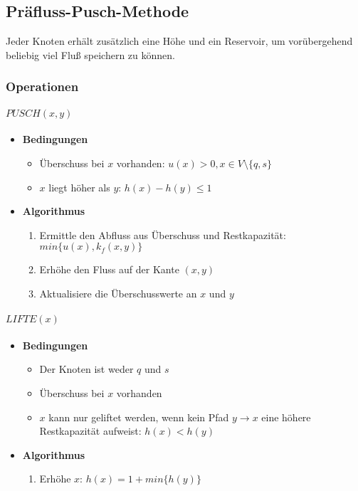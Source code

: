 \subsection{Präfluss-Pusch-Methode}
Jeder Knoten erhält zusätzlich eine Höhe und ein Reservoir, um vorübergehend beliebig viel Fluß speichern zu können.

\subsubsection{Operationen}

\paragraph{\(PUSCH(x,y)\)}
\begin{itemize}
	\item \textbf{Bedingungen}
	\begin{itemize}
		\item Überschuss bei \(x\) vorhanden: \(u(x) > 0, x \in V \setminus \{q,s\}\)
		\item \(x\) liegt höher als \(y\): \(h(x) - h(y) \leq 1\)
	\end{itemize}
	\item \textbf{Algorithmus}
	\begin{enumerate}
		\item Ermittle den Abfluss aus Überschuss und Restkapazität: \(min\{u(x), k_f(x,y)\}\)
		\item Erhöhe den Fluss auf der Kante \((x,y)\)
		\item Aktualisiere die Überschusswerte an \(x\) und \(y\)
	\end{enumerate}
\end{itemize}


\paragraph{\(LIFTE(x)\)}
\begin{itemize}
	\item \textbf{Bedingungen}
	\begin{itemize}
		\item Der Knoten ist weder \(q\) und \(s\)
		\item Überschuss bei \(x\) vorhanden
		\item \(x\) kann nur geliftet werden, wenn kein Pfad \(y \rightarrow x\) eine höhere Restkapazität aufweist: \(h(x) < h(y)\)
	\end{itemize}
	\item \textbf{Algorithmus}
	\begin{enumerate}
		\item Erhöhe \(x\): \(h(x) = 1 + min\{h(y)\}\)
	\end{enumerate}
\end{itemize}


